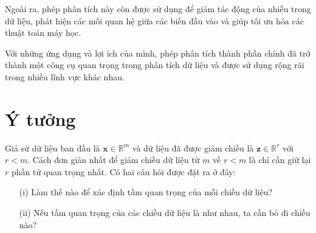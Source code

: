 \documentclass[14pt,oneside,a4paper]{report}
\numberwithin{equation}{section}
\begin{document}
Ngoài ra, phép phân tích này còn được sử dụng để giảm tác động của nhiễu trong dữ liệu, phát hiện các mối quan hệ giữa các biến đầu vào và giúp tối ưu hóa các thuật toán máy học.

Với những ứng dụng và lợi ích của mình, phép phân tích thành phần chính đã trở thành một công cụ quan trọng trong phân tích dữ liệu và được sử dụng rộng rãi trong nhiều lĩnh vực khác nhau.
\section{Ý tưởng}
Giả sử dữ liệu ban đầu là $\mathbf{x} \in \mathbb{R}^{m}$ và dữ liệu đã được giảm chiều là $\mathbf{z} \in \mathbb{R}^{r}$ với $r<m$. Cách đơn giản nhất để giảm chiều dữ liệu từ $m$ về $r<m$ là chỉ cần giữ lại $r$ phần tử quan trọng nhất. Có hai câu hỏi được đặt ra ở đây:
\begin{itemize}

\item[(i)] Làm thế nào để xác định tầm quan trọng của mỗi chiều dữ liệu?
\item[(ii)] Nếu tầm quan trọng của các chiều dữ liệu là như nhau, ta cần bỏ đi chiều nào?

\end{itemize}
\end{document}

